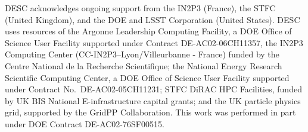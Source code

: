 DESC acknowledges ongoing support from the IN2P3 (France), the STFC 
(United Kingdom), and the DOE and LSST Corporation (United States).  
DESC uses resources of the Argonne Leadership Computing Facility, a DOE
Office of Science User Facility supported under Contract DE-AC02-06CH11357, 
the IN2P3 Computing Center (CC-IN2P3--Lyon/Villeurbanne - France) funded by
the Centre National de la Recherche Scientifique; the National Energy Research
Scientific Computing Center, a DOE Office of Science User Facility 
supported under Contract No.\ DE-AC02-05CH11231; STFC DiRAC HPC Facilities, 
funded by UK BIS National E-infrastructure capital grants; and the UK 
particle physics grid, supported by the GridPP Collaboration.  This work was 
performed in part under DOE Contract DE-AC02-76SF00515.

